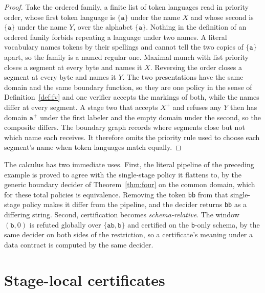 \documentclass[11pt,a4paper]{article}
\theoremstyle{definition}
\theoremstyle{plain}
\newcommand{\code}[1]{\texttt{#1}}
\begin{document}
\begin{proof}
Take the ordered family, a finite list of token languages read in priority order, whose first token language is
$\{\code{a}\}$ under the name $X$ and whose second is $\{\code{a}\}$ under the name $Y$, over the alphabet
$\{\code{a}\}$. Nothing in the definition of an ordered family forbids repeating a language under two names. A literal
vocabulary names tokens by their spellings and cannot tell the two copies of $\{\code{a}\}$ apart, so the family is a
named regular one. Maximal munch with list priority closes a segment at every byte and names it $X$. Reversing the order
closes a segment at every byte and names it $Y$. The two presentations have the same domain and the same boundary
function, so they are one policy in the sense of Definition~\ref{def:fv} and one verifier accepts the markings of both,
while the names differ at every segment. A stage two that accepts $X^{+}$ and refuses any $Y$ then has domain
$\code{a}^{+}$ under the first labeler and the empty domain under the second, so the composite differs. The boundary
graph records where segments close but not which name each receives. It therefore omits the priority rule used to choose
each segment's name when token languages match equally.
\end{proof}

The calculus has two immediate uses. First, the literal pipeline of the preceding example is proved to agree with the
single-stage policy it flattens to, by the generic boundary decider of Theorem~\ref{thm:four} on the common domain,
which for these total policies is equivalence. Removing the token \code{bb} from that single-stage policy makes it
differ from the pipeline, and the decider returns \code{bb} as a differing string. Second, certification becomes
\emph{schema-relative}. The window $(\code{b}, 0)$ is refuted globally over $\{\code{ab}, \code{b}\}$ and certified on
the \code{b}-only schema, by the same decider on both sides of the restriction, so a certificate's meaning under a data
contract is computed by the same decider.

\section{Stage-local certificates}\label{sec:transfer}

\end{document}
